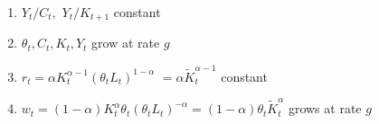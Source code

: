 \documentclass[notes=show]{beamer}
\begin{document}
\begin{frame}%


\begin{enumerate}
\item $Y_{t}/C_{t},$ $Y_{t}/K_{t+1}$ constant

\item $\theta _{t},C_{t},K_{t},Y_{t}$ grow at rate $g$

\item $r_{t}=\alpha K_{t}^{\alpha -1}\left( \theta _{t}L_{t}\right)
^{1-\alpha }$ $=\alpha \tilde{K}_{t}^{\alpha -1}$ constant

\item $w_{t}=\left( 1-\alpha \right) K_{t}^{\alpha }\theta _{t}\left( \theta
_{t}L_{t}\right) ^{-\alpha }=\left( 1-\alpha \right) \theta _{t}\tilde{K}%
_{t}^{\alpha }$ grows at rate $g$
\end{enumerate}

\transboxout%
\end{frame}%
\end{document}

